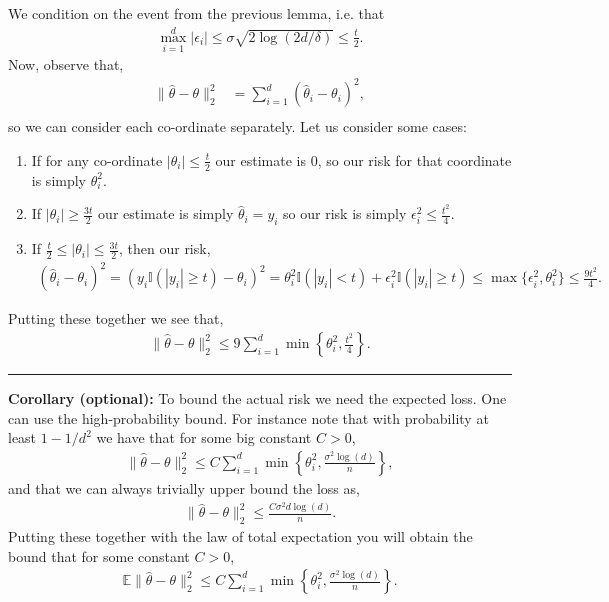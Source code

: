 \documentclass[twoside,12pt]{article}
\newenvironment{proof}{{\bf Proof:}}{\hfill\rule{2mm}{2mm}}
\begin{document}
\begin{proof}
We condition on the event from the previous lemma, i.e. that 
\begin{align*}\max_{i=1}^d |\epsilon_i| \leq \sigma \sqrt{ 2 \log (2d/\delta) } \leq \frac{t}{2}.
\end{align*}
Now, observe that,
\begin{align*}
\|\widehat{\theta} - \theta\|_2^2 &= \sum_{i=1}^d (\widehat{\theta}_i - \theta_i)^2, \\
\end{align*}
so we can consider each co-ordinate separately. 
Let us consider some cases:
\begin{enumerate}
\item If for any co-ordinate $|\theta_i| \leq \frac{t}{2}$ our estimate is 0, so our risk for that coordinate is simply $\theta_i^2$. 
\item If $|\theta_i| \geq \frac{3t}{2}$ our estimate is simply $\widehat{\theta}_i = y_i$ so our risk is simply $\epsilon_i^2 \leq \frac{t^2}{4}$.
\item If $\frac{t}{2} \leq |\theta_i| \leq \frac{3t}{2}$, then our risk,
\begin{align*}
(\widehat{\theta}_i - \theta_i)^2 = (y_i \mathbb{I}(|y_i| \geq t) - \theta_i)^2 = \theta_i^2 \mathbb{I}(|y_i| < t) + \epsilon_i^2 \mathbb{I}(|y_i| \geq t) \leq \max\{\epsilon_i^2,\theta_i^2\} \leq \frac{9t^2}{4}.
\end{align*}
\end{enumerate}
Putting these together we see that,
\begin{align*}
\|\widehat{\theta} - \theta\|_2^2 \leq 9 \sum_{i=1}^d \min\left\{\theta_i^2,\frac{t^2}{4}\right\}.
\end{align*}
\end{proof}

{\bf Corollary (optional): } To bound the actual risk we need the expected loss. One can use the high-probability bound. For instance note that with probability at least $1 - 1/d^2$ we have that for some big constant $C > 0$,
\begin{align*}
\|\widehat{\theta} - \theta\|_2^2 \leq  C \sum_{i=1}^d \min\left\{\theta_i^2, \frac{\sigma^2 \log(d)}{n}\right\},
\end{align*}
and that we can always trivially upper bound the loss as,
\begin{align*}
\|\widehat{\theta} - \theta\|_2^2 \leq \frac{C \sigma^2 d \log(d)}{n}.
\end{align*}
Putting these together with the law of total expectation you will obtain the bound that for some constant $C > 0$,
\begin{align*}
\mathbb{E} \|\widehat{\theta} - \theta\|_2^2 \leq  C \sum_{i=1}^d \min\left\{\theta_i^2, \frac{\sigma^2 \log(d)}{n} \right\}.
\end{align*}
\end{document}
